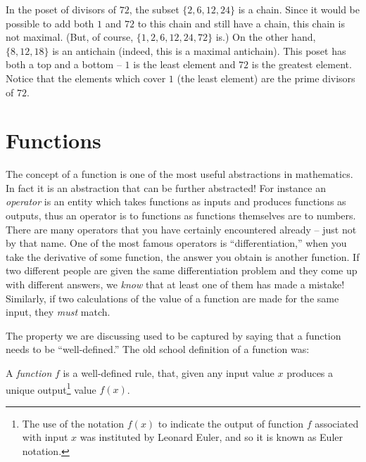 In the poset of divisors of $72$, the subset $\{2, 6, 12, 24\}$ is a chain.  
Since it would be possible to add both $1$ and $72$ to this chain and still 
have a chain, this chain is not maximal.  (But, of course, 
$\{1, 2, 6, 12, 24, 72\}$ is.)  On the other hand, 
$\{8, 12, 18\}$ is an antichain (indeed, this is a maximal antichain).  
This poset has both a top and a bottom -- $1$ is the least element
and $72$ is the greatest element.   Notice that the elements which cover
$1$ (the least element) are the prime divisors of $72$.

\newpage




\newpage

\section{Functions}
\label{sec:functions}

The concept of a function is one of the most useful abstractions
in mathematics.  In fact it is an abstraction that can be further
abstracted!  For instance an \emph{operator} 
is an entity which takes functions as inputs and produces functions
as outputs, thus an operator is to functions as functions themselves
are to numbers.  There are many operators that you have certainly
encountered already -- just not by that name.  One of the most
famous operators is ``differentiation,'' when you take the derivative
of some function, the answer you obtain is another function.  
If two different people are given the same differentiation problem
and they come up with different answers, we \emph{know} that at least
one of them has made a mistake!  Similarly, if two calculations of the
value of a function are made for the same input, they \emph{must} match.

The property we are discussing used to be captured by saying that a 
function needs to be ``well-defined.''  The old school definition of a 
function was: 

\begin{defi}
 A \emph{function} $f$ is a well-defined rule, that, given any input
value $x$ produces a unique output\footnote{The use of the notation %
$f(x)$ to indicate the output of function $f$ associated with input $x$ %
was instituted by Leonard Euler, and so it is known as Euler notation.} 
value $f(x)$.
\end{defi}


